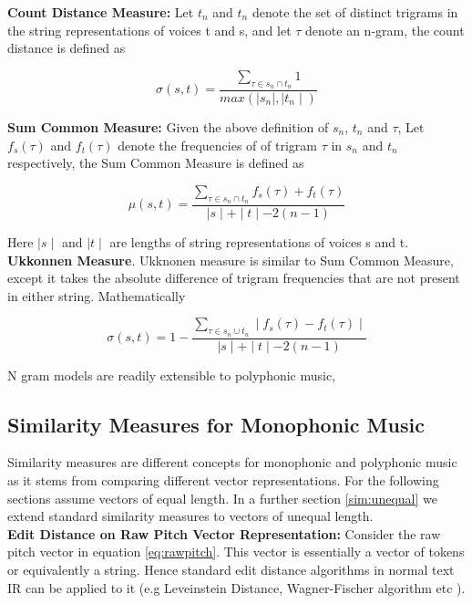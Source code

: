 \noindent \textbf{Count Distance Measure:} Let $t_n$ and $t_n$ denote the set of distinct trigrams in the string representations of voices t and s, and let $\tau$ denote an n-gram, the count distance is defined as 

\begin{equation}
\sigma(s, t) = \frac{\sum_{\tau \in s_n \cap t_n} 1}{max (\mid s_n \mid, \mid t_n \mid)}
\end{equation}

\noindent \textbf{Sum Common Measure:} Given the above definition of $s_n$, $t_n$ and $\tau$, Let $f_s(\tau)$ and $f_t(\tau)$ denote the frequencies of of trigram $\tau$ in $s_n$  and $t_n$ respectively, the Sum Common Measure is defined as

\begin{equation}
\mu(s, t) = \frac{\sum_{\tau \in s_n \cap t_n} f_s(\tau) + f_t(\tau)}{\mid s \mid + \mid t \mid - 2(n-1)}
\end{equation}

Here $\mid s \mid$ and $\mid t \mid$ are lengths of string representations of voices s and t. \\

\noindent \textbf{Ukkonnen Measure}. Ukknonen measure is similar to Sum Common Measure, except it takes the absolute difference of trigram frequencies that are not present in either string. Mathematically 

\begin{equation}
\sigma(s, t) = 1 - \frac{\sum_{\tau \in s_n \cup t_n} \mid f_s(\tau) - f_t(\tau) \mid}{\mid s \mid + \mid t \mid - 2(n-1)}
\end{equation}

\noindent N gram models are readily extensible to polyphonic music, 

\subsection{Similarity Measures for Monophonic Music} \label{monophonicSim}

\noindent Similarity measures are different concepts for monophonic and polyphonic music as it stems from comparing different vector representations. For the following sections assume vectors of equal length. In a further section \ref{sim:unequal} we extend standard similarity measures to vectors of unequal length. \\

\noindent \textbf{Edit Distance on Raw Pitch Vector Representation:} Consider the raw pitch vector in equation \ref{eq:rawpitch}. This vector is essentially a vector of tokens or equivalently a string. Hence standard edit distance algorithms in normal text IR can be applied to it (e.g Leveinstein Distance, Wagner-Fischer algorithm etc \cite{simtour}).

